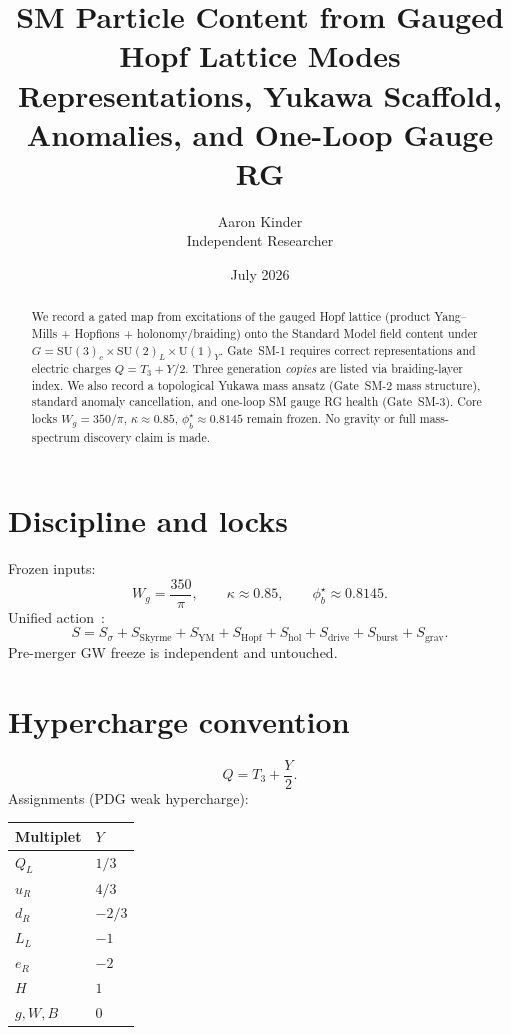 \documentclass[11pt]{article}
\title{SM Particle Content from Gauged Hopf Lattice Modes\\
\large Representations, Yukawa Scaffold, Anomalies, and One-Loop Gauge RG}
\author{Aaron Kinder \\ Independent Researcher}
\date{July 2026}
\begin{document}
\maketitle

\begin{abstract}
We record a gated map from excitations of the gauged Hopf lattice
(product Yang--Mills + Hopfions + holonomy/braiding) onto the Standard Model
field content under $G=\mathrm{SU}(3)_c\times\mathrm{SU}(2)_L\times\mathrm{U}(1)_Y$.
Gate~SM-1 requires correct representations and electric charges $Q=T_3+Y/2$.
Three generation \emph{copies} are listed via braiding-layer index.
We also record a topological Yukawa mass ansatz (Gate~SM-2 mass structure),
standard anomaly cancellation, and one-loop SM gauge RG health (Gate~SM-3).
Core locks $W_g=350/\pi$, $\kappa\approx 0.85$, $\phi_b^\star\approx 0.8145$ remain
frozen. No gravity or full mass-spectrum discovery claim is made.
\end{abstract}

\section{Discipline and locks}

Frozen inputs:
\[
W_g=\frac{350}{\pi},\qquad \kappa\approx 0.85,\qquad \phi_b^\star\approx 0.8145.
\]
Unified action~\cite{lag,rel}:
\begin{equation}
S=S_\sigma+S_{\mathrm{Skyrme}}+S_{\mathrm{YM}}
+S_{\mathrm{Hopf}}+S_{\mathrm{hol}}+S_{\mathrm{drive}}
+S_{\mathrm{burst}}+S_{\mathrm{grav}}.
\label{eq:unified-action}
\end{equation}
Pre-merger GW freeze is independent and untouched.

\section{Hypercharge convention}

\begin{equation}
Q = T_3 + \frac{Y}{2}.
\label{eq:Q}
\end{equation}
Assignments (PDG weak hypercharge):
\begin{center}
\begin{tabular}{@{}ll@{}}
\hline
Multiplet & $Y$ \\
\hline
$Q_L$ & $1/3$ \\
$u_R$ & $4/3$ \\
$d_R$ & $-2/3$ \\
$L_L$ & $-1$ \\
$e_R$ & $-2$ \\
$H$ & $1$ \\
$g,W,B$ & $0$ \\
\hline
\end{tabular}
\end{center}
\end{document}
